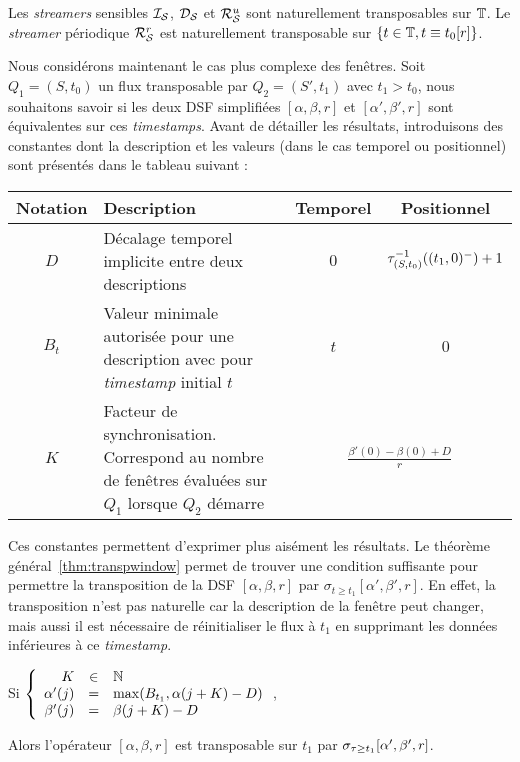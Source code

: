 \begin{prop}\label{prop:transpstr}
    Les \textit{streamers} sensibles $\mathcal{I_S}$, $\mathcal{D_S}$ et $\mathcal{R}_{\mathcal S}^{u}$ sont naturellement transposables sur $\mathbb{T}$.
    Le \textit{streamer} périodique $\mathcal{R}_{\mathcal S}^{r}$ est naturellement transposable sur $\{t\in \mathbb{T}, t\equiv t_0 [r]\}$.
\end{prop}

Nous considérons maintenant le cas plus complexe des fenêtres. Soit $Q_1=(S,t_0)$ un flux transposable par $Q_2=(S',t_1)$ avec $t_1 > t_0$, nous souhaitons savoir si les deux DSF simplifiées $[\alpha,\beta,r]$ et $[\alpha',\beta',r]$ sont équivalentes sur ces \textit{timestamps}. Avant de détailler les résultats, introduisons des constantes dont la description et les valeurs (dans le cas temporel ou positionnel) sont présentés dans le tableau suivant :

\noindent\begin{tabularx}{\linewidth}{|c|X|c|c|} \bottomrule
\rowcolor{hypcolor}     Notation & Description & Temporel & Positionnel\\ \hline
    $D$ & Décalage temporel implicite entre deux descriptions & $0$ & $\tau^{-1}_{(S,t_0)} ((t_1,0)^-)+1$ \\\hline
    $B_t$ & Valeur minimale autorisée pour une description avec pour \textit{timestamp} initial $t$ & $t$ & $0$ \\ \hline
    $K$ & Facteur de synchronisation. Correspond au nombre de fenêtres évaluées sur $Q_1$ lorsque $Q_2$ démarre & \multicolumn{2}{c|}{$\displaystyle\frac{\beta'(0)-\beta(0)+D}{r}$} \\ \toprule
\end{tabularx}

Ces constantes permettent d'exprimer plus aisément les résultats. Le théorème général~\ref{thm:transpwindow} permet de trouver une condition suffisante pour permettre la transposition de la DSF $[\alpha,\beta,r]$ par $\sigma_{t\geq t_1} [\alpha',\beta',r]$. En effet, la transposition n'est pas naturelle car la description de la fenêtre peut changer, mais aussi il est nécessaire de réinitialiser le flux à $t_1$ en supprimant les données inférieures à ce \textit{timestamp}.
\begin{thm}\label{thm:transpwindow}
    Si $\left\{\begin{array}{rcl} K &\in& \mathbb{N} \\\alpha'(j) &=& \max(B_{t_1}, \alpha(j+K)-D)\\ \beta'(j) &=&  \beta(j+K)-D \end{array}\right.$,

    Alors l'opérateur $[\alpha,\beta,r]$ est transposable sur $t_1$ par $\sigma_{\tau\geq t_1} [\alpha',\beta',r]$.
\end{thm}


